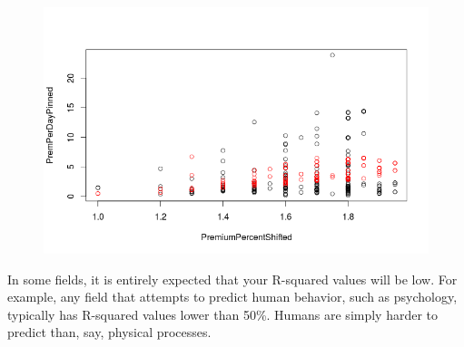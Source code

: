 \documentclass{article}
\begin{document}
\begin{figure}[H]
\centering
\includegraphics[width=0.45\paperwidth]{pinnedPremPerDayWithUWL.png}
\end{figure}

In some fields, it is entirely expected that your R-squared values will be low. For example, any field that attempts to predict human behavior, such as psychology, typically has R-squared values lower than 50\%. Humans are simply harder to predict than, say, physical processes.
\end{document}

